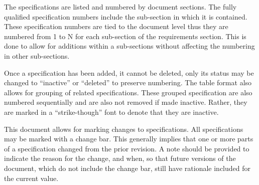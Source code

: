 

The specifications are listed and numbered by document sections. 
The fully qualified specification numbers include the sub-section in which it is contained. 
These specification numbers are tied to the document level thus they are numbered from 1 to N for each sub-section of the requirements section. 
This is done to allow for additions within a sub-sections without affecting the numbering in other sub-sections. 

Once a specification has been added, it cannot be deleted, only its status may be changed to ``inactive'' or ``deleted'' to preserve numbering.
The table format also allows for grouping of related specifications.
These grouped specification are also numbered sequentially and are also not removed if made inactive. 
Rather, they are marked in a ``strike-though'' font to denote that they are inactive.

This document allows for marking changes to specifications.
All specifications may be marked with a change bar.
This generally implies that one or more parts of a specification changed from the prior revision.
A note should be provided to indicate the reason for the change, and when, so that future versions of the document, which do not include the change bar, still have rationale included for the current value.



